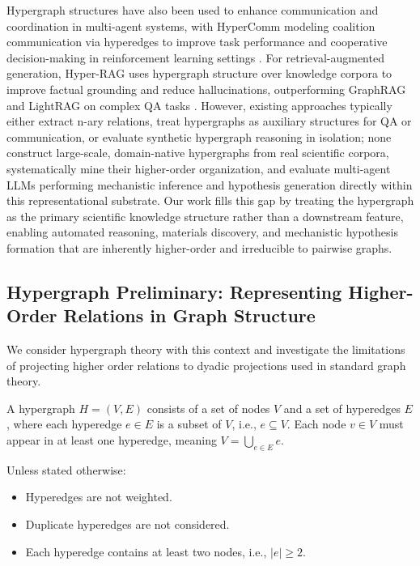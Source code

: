 \documentclass{article}
\begin{document}
Hypergraph structures have also been used to enhance communication and coordination in multi-agent systems, with HyperComm modeling coalition communication via hyperedges to improve task performance and cooperative decision-making in reinforcement learning settings \cite{zhu_hypercomm_2024}. For retrieval-augmented generation, Hyper-RAG uses hypergraph structure over knowledge corpora to improve factual grounding and reduce hallucinations, outperforming GraphRAG and LightRAG on complex QA tasks \cite{feng_hyper-rag_2025}. However, existing approaches typically either extract n-ary relations, treat hypergraphs as auxiliary structures for QA or communication, or evaluate synthetic hypergraph reasoning in isolation; none construct large-scale, domain-native hypergraphs from real scientific corpora, systematically mine their higher-order organization, and evaluate multi-agent LLMs performing mechanistic inference and hypothesis generation directly within this representational substrate. Our work fills this gap by treating the hypergraph as the primary scientific knowledge structure rather than a downstream feature, enabling automated reasoning, materials discovery, and mechanistic hypothesis formation that are inherently higher-order and irreducible to pairwise graphs.

\subsection{Hypergraph Preliminary: Representing Higher-Order Relations in Graph Structure}

We consider hypergraph theory with this context and investigate the limitations of projecting higher order relations to dyadic projections used in standard graph theory. 

A hypergraph \( H = (V, E) \) consists of a set of nodes \( V \) and a set of hyperedges \( E \), where each hyperedge \( e \in E \) is a subset of \( V \), i.e., \( e \subseteq V \). Each node \( v \in V \) must appear in at least one hyperedge, meaning \( V = \bigcup_{e \in E} e \).

Unless stated otherwise:
\begin{itemize}
  \item Hyperedges are not weighted.
  \item Duplicate hyperedges are not considered.
  \item Each hyperedge contains at least two nodes, i.e., \( |e| \geq 2 \).
\end{itemize}
\end{document}
